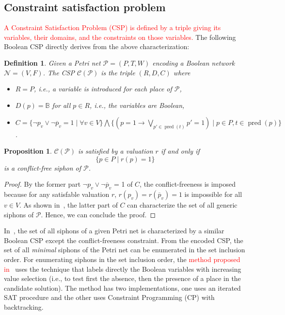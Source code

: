\documentclass[preprint,12pt]{elsarticle}
\newtheorem{definition}{Definition}[section]
\newtheorem{proposition}{Proposition}[section]
\newcommand{\change}[1]{\textcolor{red}{#1}}
\DeclareMathOperator{\pred}{pred}
\begin{document}
\subsection{Constraint satisfaction problem}%
\label{subsec:computation_csp}

\change{A Constraint Satisfaction Problem (CSP) is defined by a triple giving its variables, their domains, and the constraints on those variables.}
The following Boolean CSP directly derives from the above characterization:
\begin{definition}

  Given a Petri net \(\mathcal{P} = (P, T, W)\) encoding a Boolean network \(\mathcal{N} = (V, F)\).
  The CSP \(\mathcal{C}(\mathcal{P})\) is the triple \((R, D, C)\) where
  \begin{itemize}%
    \item \(R = P\), i.e., a variable is introduced for each place of \(\mathcal{P}\),
    \item \(D(p) = \mathbb{B}\) for all \(p \in R\), i.e., the variables are Boolean,
    \item \(C = \{\neg p_v \vee \neg \overline{p}_v = 1 \mid \forall v \in V\} \bigwedge
\{(p = 1 \rightarrow \bigvee_{p' \in \pred(t)}p' = 1) \mid p \in P, t \in \pred(p)\}\).
  \end{itemize}

\end{definition}

\begin{proposition}%
\label{prop:csp_conflict_free_siphon}
  \(\mathcal{C}(\mathcal{P})\) is satisfied by a valuation \(r\) if and only if
  \[
    \{p \in P \;|\; r(p) = 1\}\
  \]
  is a conflict-free siphon of \(\mathcal{P}\).

\end{proposition}

\begin{proof}

  By the former part \(\neg p_v \vee \neg \overline{p}_v\) = 1 of \(C\), the conflict-freeness is imposed because for any satisfable valuation \(r\), \(r(p_v) = r(\overline{p}_v) = 1\) is impossible for all \(v \in V\).
  As shown in~\cite{nabli2016enumerating}, the latter part of \(C\) can characterize the set of all generic siphons of \(\mathcal{P}\).
  Hence, we can conclude the proof.

\end{proof}

In~\cite{nabli2016enumerating}, the set of all siphons of a given Petri net is characterized by a similar Boolean CSP except the conflict-freeness constraint.
From the encoded CSP, the set of all \emph{minimal} siphons of the Petri net can be enumerated in the set inclusion order.
For enumerating siphons in the set inclusion order, the \change{method proposed in}~\cite{nabli2016enumerating} uses the technique that labels directly the Boolean variables with increasing value selection (i.e., to test first the absence, then the presence of a place in the candidate solution).
The method has two implementations, one uses an iterated SAT procedure and the other uses Constraint Programming (CP) with backtracking.
\end{document}
